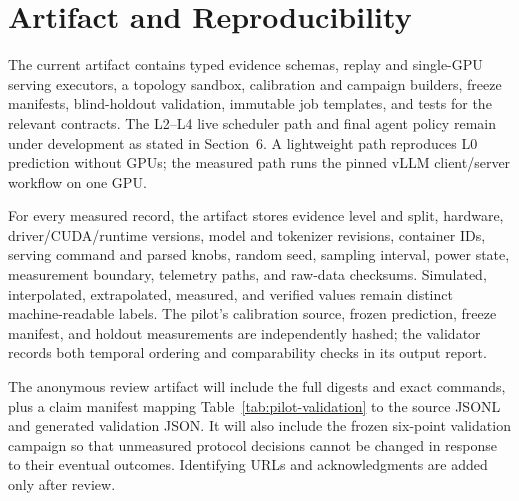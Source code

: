 \section{Artifact and Reproducibility}

The current \system{} artifact contains typed evidence schemas, replay and
single-GPU serving executors, a topology sandbox, calibration and campaign
builders, freeze manifests, blind-holdout validation, immutable job templates,
and tests for the relevant contracts.  The L2--L4 live scheduler path and final
agent policy remain under development as stated in Section~6.  A lightweight
path reproduces L0 prediction without GPUs; the measured path runs the pinned
vLLM client/server workflow on one GPU.

For every measured record, the artifact stores evidence level and split,
hardware, driver/CUDA/runtime versions, model and tokenizer revisions,
container IDs, serving command and parsed knobs, random seed, sampling
interval, power state, measurement boundary, telemetry paths, and raw-data
checksums.  Simulated, interpolated, extrapolated, measured, and verified values
remain distinct machine-readable labels.  The pilot's calibration source,
frozen prediction, freeze manifest, and holdout measurements are independently
hashed; the validator records both temporal ordering and comparability checks
in its output report.

The anonymous review artifact will include the full digests and exact commands,
plus a claim manifest mapping Table~\ref{tab:pilot-validation} to the source
JSONL and generated validation JSON.  It will also include the frozen six-point
validation campaign so that unmeasured protocol decisions cannot be changed in
response to their eventual outcomes.  Identifying URLs and acknowledgments are
added only after review.

